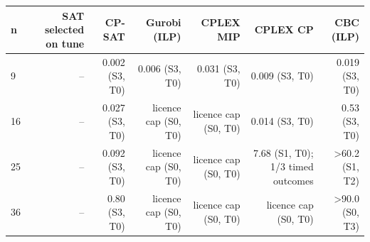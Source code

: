 \begin{tabular}{lrrrrrr}
\toprule
n & SAT selected on tune & CP-SAT & Gurobi (ILP) & CPLEX MIP & CPLEX CP & CBC (ILP) \\
\midrule
9 & -- & 0.002 (S3, T0) & 0.006 (S3, T0) & 0.031 (S3, T0) & 0.009 (S3, T0) & 0.019 (S3, T0) \\
16 & -- & 0.027 (S3, T0) & licence cap (S0, T0) & licence cap (S0, T0) & 0.014 (S3, T0) & 0.53 (S3, T0) \\
25 & -- & 0.092 (S3, T0) & licence cap (S0, T0) & licence cap (S0, T0) & 7.68 (S1, T0); 1/3 timed outcomes & >60.2 (S1, T2) \\
36 & -- & 0.80 (S3, T0) & licence cap (S0, T0) & licence cap (S0, T0) & licence cap (S0, T0) & >90.0 (S0, T3) \\
\bottomrule
\end{tabular}
